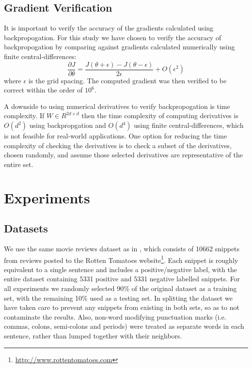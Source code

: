 \documentclass{article}
\begin{document}
\subsection{Gradient Verification}
It is important to verify the accuracy of the gradients calculated using backpropogation. For this study we have chosen to verify the accuracy of backpropogation by comparing against gradients calculated numerically using finite central-differences:
\begin{equation}
    \frac{\partial J}{\partial \theta} = \frac{J(\theta + \epsilon) - J(\theta - \epsilon)}{2\epsilon} + O(\epsilon ^2)
\end{equation}
where $\epsilon$ is the grid spacing. The computed gradient was then verified to be correct within the order of $10^6$.

A downside to using numerical derivatives to verify backpropogation is time complexity. If $W \in R^{2d \times d}$ then the time complexity of computing derivatives is $O(d^2)$ using backpropgation and $O(d^4)$ using finite central-differences, which is not feasible for real-world applications. One option for reducing the time complexity of checking the derivatives is to check a subset of the derivatives, chosen randomly, and assume those selected derivatives are representative of the entire set.


\section{Experiments}

%
%
\subsection{Datasets}
We use the same movie reviews dataset as in \cite{Socher}, which consists of 10662 snippets from reviews posted to the Rotten Tomatoes website\footnote{\url{http://www.rottentomatoes.com}}. Each snippet is roughly equivalent to a single sentence and includes a positive/negative label, with the entire dataset containing 5331 positive and 5331 negative labelled snippets. For all experiments we randomly selected 90\% of the original dataset as a training set, with the remaining 10\% used as a testing set. In splitting the dataset we have taken care to prevent any snippets from existing in both sets, so as to not contaminate the results. Also, non-word modifying punctuation marks (i.e. commas, colons, semi-colons and periods) were treated as separate words in each sentence, rather than lumped together with their neighbors.
\end{document}
